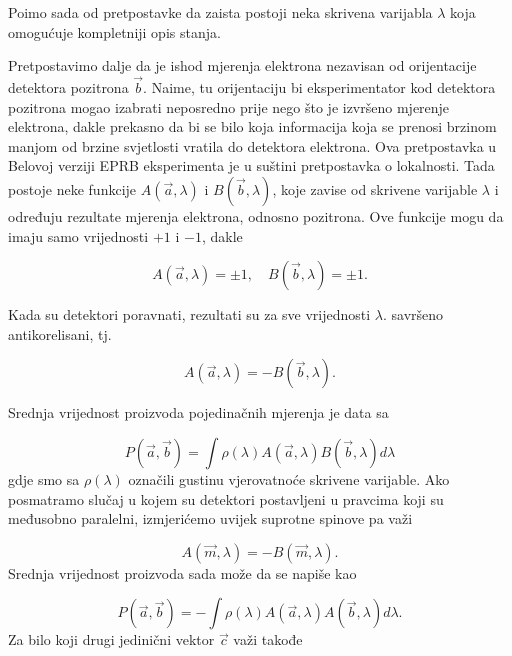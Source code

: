 Po\dj imo sada od pretpostavke da zaista postoji neka skrivena varijabla $\lambda$ koja omogućuje kompletniji opis stanja.

Pretpostavimo dalje da je ishod mjerenja elektrona nezavisan od orijentacije detektora pozitrona  $\vec{b}$. Naime, tu orijentaciju bi eksperimentator kod detektora pozitrona mogao izabrati neposredno prije nego što je izvršeno mjerenje elektrona, dakle prekasno da bi se bilo koja informacija koja se prenosi brzinom manjom od brzine svjetlosti vratila do detektora elektrona. Ova pretpostavka u Belovoj verziji EPRB eksperimenta je u suštini pretpostavka o lokalnosti.
Tada postoje neke funkcije $A(\vec{a}, \lambda)$ i $B(\vec{b}, \lambda)$, koje zavise od skrivene varijable $\lambda$ i određuju rezultate mjerenja elektrona, odnosno pozitrona.
Ove funkcije mogu da imaju samo vrijednosti $+1$ i $-1$, dakle 

\begin{equation}
    A(\vec{a}, \lambda) = \pm 1, \quad B(\vec{b}, \lambda) = \pm 1.
\end{equation}

Kada su detektori poravnati, rezultati su za sve vrijednosti $\lambda$. savršeno antikorelisani, tj.

\begin{equation}
    A(\vec{a}, \lambda) = -B(\vec{b}, \lambda).
\end{equation}

Srednja vrijednost proizvoda pojedinačnih mjerenja je data sa

\begin{equation}
    P(\vec{a}, \vec{b}) = \int \rho (\lambda) A(\vec{a}, \lambda) B(\vec{b}, \lambda) d\lambda
\end{equation}
gdje smo sa $\rho (\lambda)$ označili gustinu vjerovatnoće skrivene varijable.
Ako posmatramo slučaj u kojem su detektori postavljeni u pravcima koji su međusobno paralelni, izmjerićemo uvijek suprotne spinove pa važi

\begin{equation}
    A(\vec{m}, \lambda) = - B(\vec{m}, \lambda).
\end{equation}
Srednja vrijednost proizvoda sada može da se napiše kao

\begin{equation}
    P(\vec{a}, \vec{b}) = - \int \rho (\lambda) A(\vec{a}, \lambda) A(\vec{b}, \lambda) d\lambda.
\end{equation}
Za bilo koji drugi jedinični vektor $\vec{c}$ važi takođe

